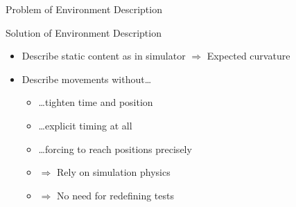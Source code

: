 \documentclass[aspectratio=169]{beamer}
\begin{document}
\begin{frame}{Problem of Environment Description}
    \centering
\end{frame}

\begin{frame}{Solution of Environment Description}
    \begin{itemize}[<+ (1)->]
        \item Describe static content as in simulator
            \pause%
            \(\Rightarrow\) Expected curvature
        \item Describe movements without\ldots
            \begin{itemize}
                \item \ldots tighten time and position
                \item \ldots explicit timing at all
                \item \ldots forcing to reach positions precisely
                \item \(\Rightarrow\) Rely on simulation physics
                \item \(\Rightarrow\) No need for redefining tests
            \end{itemize}
    \end{itemize}
\end{frame}
\end{document}
